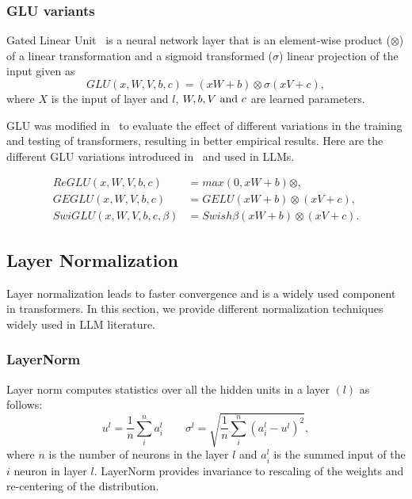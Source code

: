 \subsubsection{GLU variants~\cite{shazeer2020glu}}
\label{ss:gluvariants}
Gated Linear Unit~\cite{glu} is a neural network layer that is an element-wise product ($\otimes$) of a linear transformation and a sigmoid transformed ($\sigma$) linear projection of the input given as
\begin{equation}
GLU(x, W, V, b, c) = (xW + b) \otimes \sigma (xV + c),
\end{equation}
where $X$ is the input of layer and $l$, $W, b, V \textnormal{ and }c$ are learned parameters.

GLU was modified in~\cite{shazeer2020glu} to evaluate the effect of different variations in the training and testing of transformers, resulting in better empirical results. Here are the different GLU variations introduced in~\cite{shazeer2020glu} and used in LLMs. 

\begin{align*}
ReGLU(x, W, V, b, c) &= max(0, xW + b) \otimes , \\
GEGLU(x, W, V, b, c) &= GELU(xW + b) \otimes (xV + c), \\
SwiGLU(x, W, V, b, c, \beta) &= Swish\beta (xW + b) \otimes (xV + c).          
\end{align*}

\subsection{Layer Normalization}
\label{sec:layernormalization}
Layer normalization leads to faster convergence and is a widely used component in transformers. In this section, we provide different normalization techniques widely used in LLM literature.

\subsubsection{LayerNorm}
\label{ss:layernorm}
Layer norm computes statistics over all the hidden units in a layer $(l)$ as follows: 
\begin{equation}
u^l = \frac{1}{n} \sum_{i}^{n} a_i^l \hspace{2em} \sigma^l = \sqrt{\frac{1}{n} \sum_{i}^{n} (a_i^l - u^l)^2} ,
\end{equation}
where $n$ is the number of neurons in the layer $l$ and $a_i^l$ is the summed input of the $i$ neuron in layer $l$. LayerNorm provides invariance to rescaling of the weights and re-centering of the distribution.

